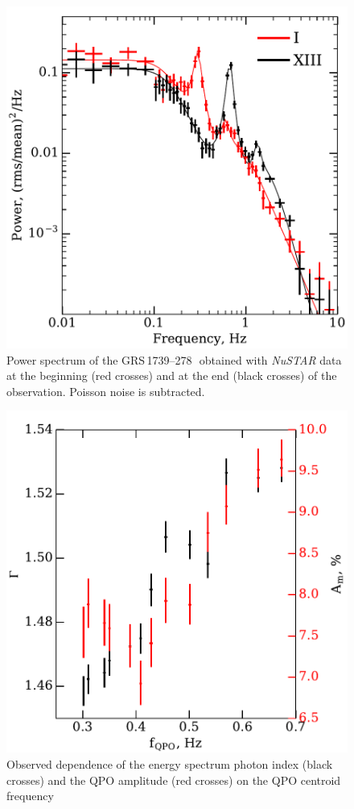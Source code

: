 \documentclass[a4paper,fleqn,usenatbib]{mnras}
\def\grs{{GRS\,1739--278\,}}
\begin{document}
\begin{figure}
        \includegraphics[width=\columnwidth]{qpo_centroid_evolution.pdf}
        \caption{Power spectrum of the \grs\ obtained with {\it NuSTAR} data at the beginning (red crosses) and at the end (black crosses) of the observation. Poisson noise is subtracted.}
        \label{fig:qpo}
\end{figure}

\begin{figure}
        \includegraphics[width=\columnwidth]{QPO_correlation_graph.pdf}
        \caption{Observed dependence of the energy spectrum photon index (black crosses) and the QPO amplitude (red crosses) on the QPO centroid frequency}
        \label{fig:qpo_gamma}
\end{figure}
\end{document}
